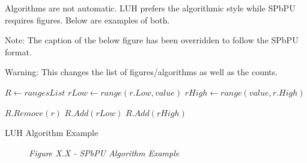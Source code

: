 \label{sec:examples_algorithms}
Algorithms are not automatic. LUH prefers the algorithmic style while SPbPU requires figures. Below are examples of both.

Note: The caption of the below figure has been overridden to follow the SPbPU format. 

Warning: This changes the list of figures/algorithms as well as the counts. 

\begin{algorithm}[H]
    \centering
    \footnotesize
    \begin{algorithmic}[1]
        \State $R \gets rangesList$
            \State $rLow \gets range(r.Low, value)$
            \State $rHigh \gets range(value, r.High)$
            
            \State $R.Remove(r)$
            \State $R.Add(rLow)$
            \State $R.Add(rHigh)$
        \EndProcedure
    \end{algorithmic}
    \caption{LUH Algorithm Example}
    \label{alg:luh_algorithm_example}
\end{algorithm}

\begin{figure}[H]
    \centering
    \footnotesize

    \caption*{\textit{Figure X.X - SPbPU Algorithm Example}} 
\end{figure}
